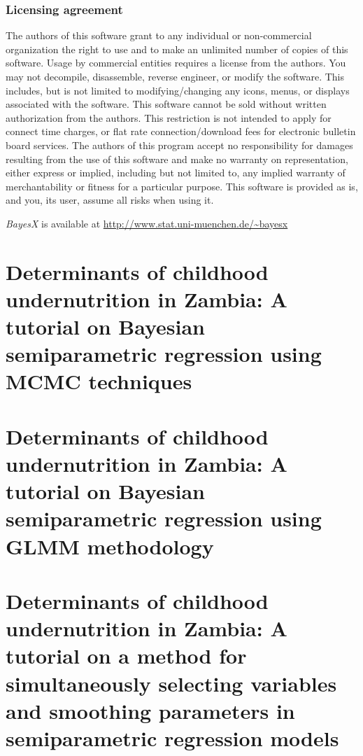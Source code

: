 \documentclass[11pt,a4paper,twoside]{bayesxreport}
\begin{document}
\subsection*{Licensing agreement} The authors of this software grant
to any individual or non-commercial organization the right to use
and to make an unlimited number of copies of this software. Usage by
commercial entities requires a license from the authors. You may not
decompile, disassemble, reverse engineer, or modify the software.
This includes, but is not limited to modifying/changing any icons,
menus, or displays associated with the software. This software
cannot be sold without written authorization from the authors. This
restriction is not intended to apply for connect time charges, or
flat rate connection/download fees for electronic bulletin board
services. The authors of this program accept no responsibility for
damages resulting from the use of this software and make no warranty
on representation, either express or implied, including but not
limited to, any implied warranty of merchantability or fitness for a
particular purpose. This software is provided as is, and you, its
user, assume all risks when using it.

\vspace{0.5cm}

{\em BayesX} is available at {
\href{http://www.stat.uni-muenchen.de/~bayesx}{http://www.stat.uni-muenchen.de/\~{}bayesx}}

\newpage

\chapter[A tutorial
on Bayesian semiparametric regression using MCMC
techniques]{Determinants of childhood undernutrition in Zambia: A
tutorial on Bayesian semiparametric regression using MCMC
techniques} \label{zambiaanalysis}



\chapter[A tutorial
on Bayesian semiparametric regression using GLMM
methodology]{Determinants of childhood undernutrition in Zambia: A
tutorial on Bayesian semiparametric regression using GLMM
methodology} \label{remlregzambiaanalysis}



\chapter[Simultaneously selecting variables and smoothing parameters] {Determinants of childhood undernutrition in Zambia: A
tutorial on a method for simultaneously selecting variables and
smoothing parameters in semiparametric regression models}
\label{zambia_step_analysis}
\end{document}
